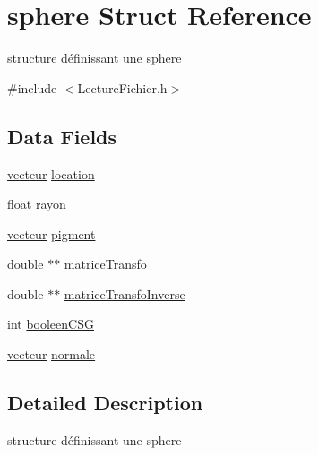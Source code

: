 \hypertarget{structsphere}{
\section{sphere Struct Reference}
\label{structsphere}
}


structure définissant une sphere  




{\ttfamily \#include $<$LectureFichier.h$>$}

\subsection*{Data Fields}
\begin{DoxyCompactItemize}
\item 
\hyperlink{structvecteur}{vecteur} \hyperlink{structsphere_ae655d799d0a983ee8cf5fc840953c404}{location}
\item 
float \hyperlink{structsphere_aa23f7a160698c954b6073da64f9bd3f0}{rayon}
\item 
\hyperlink{structvecteur}{vecteur} \hyperlink{structsphere_a5a4ee24431a1811fa1c8b75844198987}{pigment}
\item 
double $\ast$$\ast$ \hyperlink{structsphere_aa06ccc348007e3355beccf412f2f656c}{matriceTransfo}
\item 
double $\ast$$\ast$ \hyperlink{structsphere_acd7a3590501dcccfaefccbb658f83821}{matriceTransfoInverse}
\item 
int \hyperlink{structsphere_a4428e32d4383f7dee25e5a4cb192da24}{booleenCSG}
\item 
\hyperlink{structvecteur}{vecteur} \hyperlink{structsphere_a944738f40a0294270a0047acc5a77ee2}{normale}
\end{DoxyCompactItemize}


\subsection{Detailed Description}
structure définissant une sphere 

